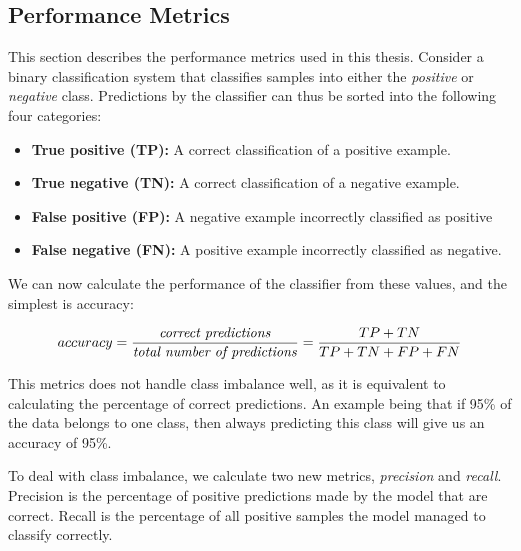     \subsection{Performance Metrics} \label{f1_score}
        This section describes the performance metrics used in this thesis. Consider a binary classification system that classifies samples into either the \textit{positive} or \textit{negative} class. Predictions by the classifier can thus be sorted into the following four categories\cite{powers2020evaluation_f1_recall_precision}:
        
        \begin{itemize}
            \item \textbf{True positive (TP):} A correct classification of a positive example.
            \item \textbf{True negative (TN):} A correct classification of a negative example.
            \item \textbf{False positive (FP):} A negative example incorrectly classified as positive
            \item \textbf{False negative (FN):} A positive example incorrectly classified as negative.
            \end{itemize}
        
        We can now calculate the performance of the classifier from these values, and the simplest is accuracy\cite{powers2020evaluation_f1_recall_precision}:
        
        \begin{equation}
            accuracy = \dfrac{\textrm{\textit{correct predictions}}}{\textrm{\textit{total number of predictions}}} = \dfrac{TP+TN}{TP+TN+FP+FN} 
        \end{equation}
        
        This metrics does not handle class imbalance well, as it is equivalent to calculating the percentage of correct predictions\cite{powers2020evaluation_f1_recall_precision}. An example being that if 95\% of the data belongs to one class, then always predicting this class will give us an accuracy of 95\%.
        
        To deal with class imbalance, we calculate two new metrics, \textit{precision} and \textit{recall}\cite{powers2020evaluation_f1_recall_precision}. Precision is the percentage of positive predictions made by the model that are correct. Recall is the percentage of all positive samples the model managed to classify correctly.
        
